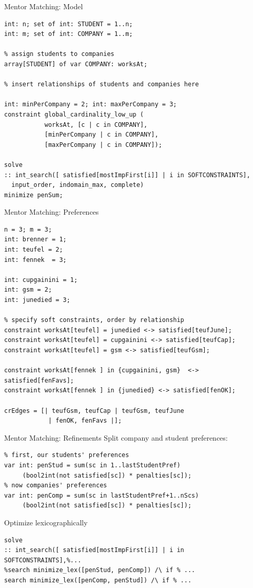 \documentclass[handout,10pt,xcolor={dvipsnames},fleqn]{beamer}
\begin{document}
\begin{frame}[fragile]{Mentor Matching: Model}
\begin{lstlisting}
int: n; set of int: STUDENT = 1..n;
int: m; set of int: COMPANY = 1..m;

% assign students to companies
array[STUDENT] of var COMPANY: worksAt;

% insert relationships of students and companies here

int: minPerCompany = 2; int: maxPerCompany = 3;
constraint global_cardinality_low_up ( 
           worksAt, [c | c in COMPANY], 
           [minPerCompany | c in COMPANY], 
           [maxPerCompany | c in COMPANY]); 
           
solve 
:: int_search([ satisfied[mostImpFirst[i]] | i in SOFTCONSTRAINTS], 
  input_order, indomain_max, complete)
minimize penSum;
\end{lstlisting}
\end{frame}

\begin{frame}[fragile]{Mentor Matching: Preferences}
\begin{lstlisting}
n = 3; m = 3;
int: brenner = 1;
int: teufel = 2;
int: fennek  = 3;

int: cupgainini = 1;
int: gsm = 2;
int: junedied = 3;

% specify soft constraints, order by relationship
constraint worksAt[teufel] = junedied <-> satisfied[teufJune];
constraint worksAt[teufel] = cupgainini <-> satisfied[teufCap];
constraint worksAt[teufel] = gsm <-> satisfied[teufGsm];

constraint worksAt[fennek ] in {cupgainini, gsm}  <-> satisfied[fenFavs];
constraint worksAt[fennek ] in {junedied} <-> satisfied[fenOK];

crEdges = [| teufGsm, teufCap | teufGsm, teufJune 
            | fenOK, fenFavs |];
\end{lstlisting}
\end{frame}

\begin{frame}[fragile]{Mentor Matching: Refinements}
Split company and student preferences:
\begin{lstlisting}
% first, our students' preferences
var int: penStud = sum(sc in 1..lastStudentPref) 
     (bool2int(not satisfied[sc]) * penalties[sc]);
% now companies' preferences
var int: penComp = sum(sc in lastStudentPref+1..nScs)
     (bool2int(not satisfied[sc]) * penalties[sc]);
\end{lstlisting}

\vspace*{3ex}

Optimize lexicographically

\begin{lstlisting}
solve 
:: int_search([ satisfied[mostImpFirst[i]] | i in SOFTCONSTRAINTS],%... 
%search minimize_lex([penStud, penComp]) /\ if % ...
search minimize_lex([penComp, penStud]) /\ if % ...
\end{lstlisting}
\end{frame}
\end{document}
